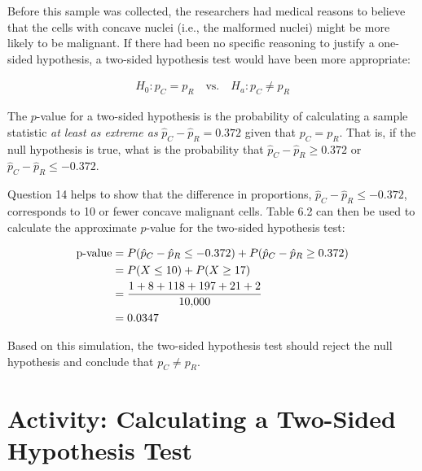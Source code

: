 \documentclass[
]{report}
\begin{document}
Before this sample was collected, the researchers had medical reasons to believe that the cells with concave nuclei (i.e., the malformed nuclei) might be more likely to be malignant. If there had been no specific reasoning to justify a one-sided hypothesis, a two-sided hypothesis test would have been more appropriate:

\begin{align}
H_0: p_C = p_R \quad\text{vs.}\quad H_a: p_C \neq p_R 
\tag{6.2}
\end{align}

The \(p\)-value for a two-sided hypothesis is the probability of calculating a sample statistic \emph{at least as extreme as} \(\hat p_C - \hat p_R = 0.372\) given that \(p_C = p_R\). That is, if the null hypothesis is true, what is the probability that \(\hat p_C - \hat p_R \ge 0.372\) or \(\hat p_C - \hat p_R \le -0.372\).

Question 14 helps to show that the difference in proportions, \(\hat p_C - \hat p_R \le -0.372\), corresponds to 10 or fewer concave malignant cells. Table 6.2 can then be used to calculate the approximate \(p\)-value for the two-sided hypothesis test:

\begin{align}
\text{p-value}
&= P(\hat p_C - \hat p_R \le -0.372) + P(\hat p_C - \hat p_R \ge 0.372) \notag \\ \notag
&= P(X \le 10) + P(X \ge 17) \\ \notag 
&= \frac{1 + 8 + 118 + 197 + 21 + 2}{10{,}000} \\ \notag
&= 0.0347 \notag
\end{align}

Based on this simulation, the two-sided hypothesis test should reject the null hypothesis and conclude that \(p_C \neq p_R\).

\section*{Activity: Calculating a Two-Sided Hypothesis Test}\label{activity-calculating-a-two-sided-hypothesis-test}
\end{document}
